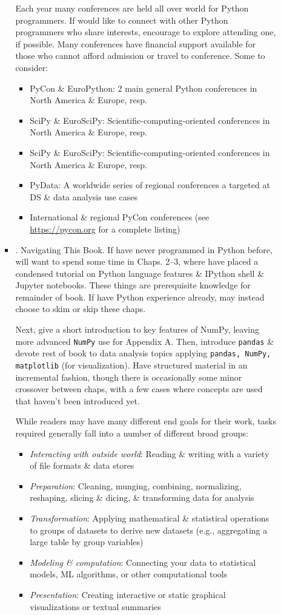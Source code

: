 \documentclass{article}
\begin{document}
\begin{enumerate}
\begin{itemize}
\begin{itemize}
			Each year many conferences are held all over world for Python programmers. If would like to connect with other Python programmers who share interests, encourage to explore attending one, if possible. Many conferences have financial support available for those who cannot afford admission or travel to conference. Some to consider:
			\begin{itemize}
				\item PyCon \& EuroPython: 2 main general Python conferences in North America \& Europe, resp.
				\item SciPy \& EuroSciPy: Scientific-computing-oriented conferences in North America \& Europe, resp.
				\item SciPy \& EuroSciPy: Scientific-computing-oriented conferences in North America \& Europe, resp.
				\item PyData: A worldwide series of regional conferences a targeted at DS \& data analysis use cases
				\item International \& regional PyCon conferences (see \url{https://pycon.org} for a complete listing)
			\end{itemize}
			\item {. Navigating This Book.} If have never programmed in Python before, will want to spend some time in Chaps. 2--3, where have placed a condensed tutorial on Python language features \& IPython shell \& Jupyter notebooks. These things are prerequisite knowledge for remainder of book. If have Python experience already, may instead choose to skim or skip these chaps.
			
			Next, give a short introduction to key features of NumPy, leaving more advanced {\tt NumPy} use for Appendix A. Then, introduce {\tt pandas} \& devote rest of book to data analysis topics applying {\tt pandas, NumPy, matplotlib} (for visualization). Have structured material in an incremental fashion, though there is occasionally some minor crossover between chaps, with a few cases where concepts are used that haven't been introduced yet.
			
			While readers may have many different end goals for their work, tasks required generally fall into a number of different broad groups:
			\begin{itemize}
				\item {\it Interacting with outside world}: Reading \& writing with a variety of file formats \& data stores
				\item {\it Preparation}: Cleaning, munging, combining, normalizing, reshaping, slicing \& dicing, \& transforming data for analysis
				\item {\it Transformation}: Applying mathematical \& statistical operations to groups of datasets to derive new datasets (e.g., aggregating a large table by group variables)
				\item {\it Modeling \& computation}: Connecting your data to statistical models, ML algorithms, or other computational tools
				\item {\it Presentation}: Creating interactive or static graphical visualizations or textual summaries
			\end{itemize}
			

\end{itemize}
\end{itemize}
\end{enumerate}
\end{document}
